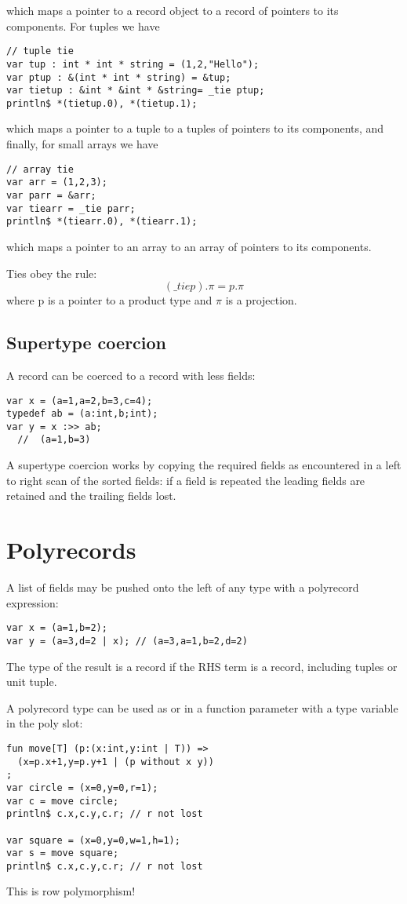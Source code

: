 \documentclass{article}
\begin{document}
which maps a pointer to a record object to a record of pointers to its
components. For tuples we have

\begin{verbatim}
// tuple tie
var tup : int * int * string = (1,2,"Hello");
var ptup : &(int * int * string) = &tup;
var tietup : &int * &int * &string= _tie ptup;
println$ *(tietup.0), *(tietup.1);
\end{verbatim}

which maps a pointer to a tuple to a tuples of pointers to its
components, and finally, for small arrays we have

\begin{verbatim}
// array tie
var arr = (1,2,3);
var parr = &arr;
var tiearr = _tie parr;
println$ *(tiearr.0), *(tiearr.1);
\end{verbatim}

which maps a pointer to an array to an array of pointers to its components.

Ties obey the rule:
$$ ({\mathrm \_tie} p) . \pi = p . \pi$$
where p is a pointer to a product type and $\pi$ is a projection.

\subsection{Supertype coercion}
A record can be coerced to a record with less fields:

\begin{verbatim}
var x = (a=1,a=2,b=3,c=4);
typedef ab = (a:int,b;int);
var y = x :>> ab; 
  //  (a=1,b=3)
\end{verbatim}

A supertype coercion works by copying the required fields
as encountered in a left to right scan of the sorted fields:
if a field is repeated the leading fields are retained
and the trailing fields lost.

\section{Polyrecords}
A list of fields may be pushed onto the left of any 
type with a polyrecord expression:

\begin{verbatim}
var x = (a=1,b=2);
var y = (a=3,d=2 | x); // (a=3,a=1,b=2,d=2)
\end{verbatim}

The type of the result is a record if the RHS term is a record, including
tuples or unit tuple. 

A polyrecord type can be used as or in a function parameter with
a type variable in the poly slot:

\begin{verbatim}
fun move[T] (p:(x:int,y:int | T)) =>
  (x=p.x+1,y=p.y+1 | (p without x y))
;
var circle = (x=0,y=0,r=1);
var c = move circle;
println$ c.x,c.y,c.r; // r not lost

var square = (x=0,y=0,w=1,h=1);
var s = move square;
println$ c.x,c.y,c.r; // r not lost
\end{verbatim}

This is row polymorphism!
\end{document}
